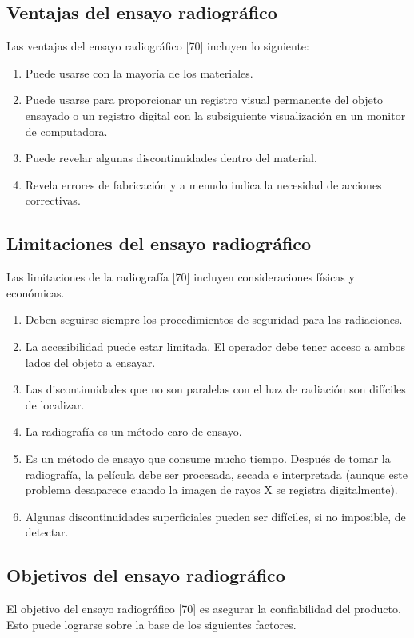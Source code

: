 \subsection{Ventajas del ensayo radiográfico}
Las ventajas del ensayo radiográfico [70] incluyen lo siguiente:

\begin{enumerate}
\item Puede usarse con la mayoría de los materiales.
\item Puede usarse para proporcionar un registro visual permanente del objeto ensayado o un registro digital con la subsiguiente visualización en un monitor de computadora.
\item Puede revelar algunas discontinuidades dentro del material.
\item Revela errores de fabricación y a menudo indica la necesidad de acciones correctivas.
\end{enumerate}

\subsection{Limitaciones del ensayo radiográfico}
Las limitaciones de la radiografía [70] incluyen consideraciones físicas y económicas.

\begin{enumerate}
\item Deben seguirse siempre los procedimientos de seguridad para las radiaciones.
\item La accesibilidad puede estar limitada. El operador debe tener acceso a ambos lados del objeto a ensayar.
\item Las discontinuidades que no son paralelas con el haz de radiación son difíciles de localizar.
\item La radiografía es un método caro de ensayo.
\item Es un método de ensayo que consume mucho tiempo. Después de tomar la radiografía, la película debe ser procesada, secada e interpretada (aunque este problema desaparece cuando la imagen de rayos X se registra digitalmente).
\item Algunas discontinuidades superficiales pueden ser difíciles, si no imposible, de detectar.
\end{enumerate}

\subsection{Objetivos del ensayo radiográfico}
El objetivo del ensayo radiográfico [70] es asegurar la confiabilidad del producto. Esto puede lograrse sobre la base de los siguientes factores.

